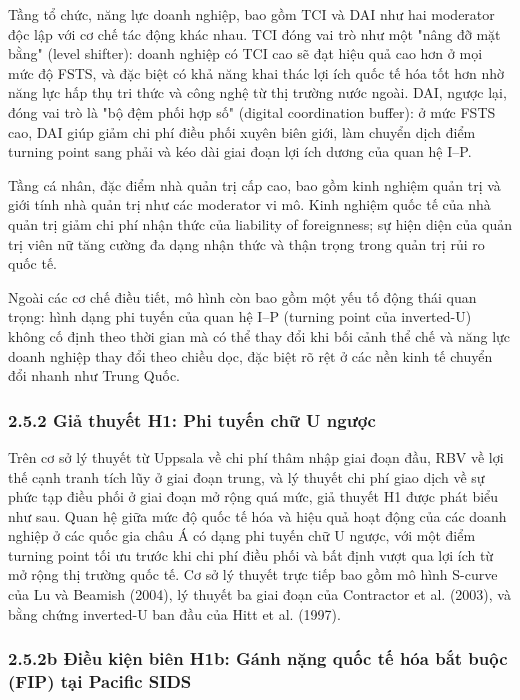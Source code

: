 \documentclass[12pt,a4paper]{article}
\begin{document}
Tầng tổ chức, năng lực doanh nghiệp, bao gồm TCI và DAI như hai
moderator độc lập với cơ chế tác động khác nhau. TCI đóng vai trò như
một "nâng đỡ mặt bằng" (level shifter): doanh nghiệp có TCI cao sẽ đạt
hiệu quả cao hơn ở mọi mức độ FSTS, và đặc biệt có khả năng khai thác
lợi ích quốc tế hóa tốt hơn nhờ năng lực hấp thụ tri thức và công nghệ
từ thị trường nước ngoài. DAI, ngược lại, đóng vai trò là "bộ đệm phối
hợp số" (digital coordination buffer): ở mức FSTS cao, DAI giúp giảm chi
phí điều phối xuyên biên giới, làm chuyển dịch điểm turning point sang
phải và kéo dài giai đoạn lợi ích dương của quan hệ I--P.

Tầng cá nhân, đặc điểm nhà quản trị cấp cao, bao gồm kinh nghiệm quản
trị và giới tính nhà quản trị như các moderator vi mô. Kinh nghiệm quốc
tế của nhà quản trị giảm chi phí nhận thức của liability of foreignness;
sự hiện diện của quản trị viên nữ tăng cường đa dạng nhận thức và thận
trọng trong quản trị rủi ro quốc tế.

Ngoài các cơ chế điều tiết, mô hình còn bao gồm một yếu tố động thái
quan trọng: hình dạng phi tuyến của quan hệ I--P (turning point của
inverted-U) không cố định theo thời gian mà có thể thay đổi khi bối cảnh
thể chế và năng lực doanh nghiệp thay đổi theo chiều dọc, đặc biệt rõ
rệt ở các nền kinh tế chuyển đổi nhanh như Trung Quốc.

\hypertarget{252-giux1ea3-thuyux1ebft-h1-phi-tuyux1ebfn-chux1eef-u-ngux1b0ux1ee3c}{%
\subsubsection{2.5.2 Giả thuyết H1: Phi tuyến chữ U
ngược}\label{252-giux1ea3-thuyux1ebft-h1-phi-tuyux1ebfn-chux1eef-u-ngux1b0ux1ee3c}}

Trên cơ sở lý thuyết từ Uppsala về chi phí thâm nhập giai đoạn đầu, RBV
về lợi thế cạnh tranh tích lũy ở giai đoạn trung, và lý thuyết chi phí
giao dịch về sự phức tạp điều phối ở giai đoạn mở rộng quá mức, giả
thuyết H1 được phát biểu như sau. Quan hệ giữa mức độ quốc tế hóa và
hiệu quả hoạt động của các doanh nghiệp ở các quốc gia châu Á có dạng
phi tuyến chữ U ngược, với một điểm turning point tối ưu trước khi chi
phí điều phối và bất định vượt qua lợi ích từ mở rộng thị trường quốc
tế. Cơ sở lý thuyết trực tiếp bao gồm mô hình S-curve của Lu và Beamish
(2004), lý thuyết ba giai đoạn của Contractor et al. (2003), và bằng
chứng inverted-U ban đầu của Hitt et al. (1997).

\hypertarget{252b-ux111iux1ec1u-kiux1ec7n-biuxean-h1b-guxe1nh-nux1eb7ng-quux1ed1c-tux1ebf-huxf3a-bux1eaft-buux1ed9c-fip-tux1ea1i-pacific-sids}{%
\subsubsection{2.5.2b Điều kiện biên H1b: Gánh nặng quốc tế hóa bắt buộc
(FIP) tại Pacific
SIDS}\label{252b-ux111iux1ec1u-kiux1ec7n-biuxean-h1b-guxe1nh-nux1eb7ng-quux1ed1c-tux1ebf-huxf3a-bux1eaft-buux1ed9c-fip-tux1ea1i-pacific-sids}}
\end{document}
